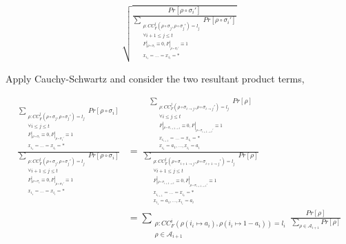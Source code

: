 \begin{align*}
            \sqrt{\frac{Pr[\rho \circ \sigma_{i}']}{\underset{\substack{\rho: CC_F^{j}(\rho\circ \sigma_j, \rho \circ \sigma_j')= l_j\\ \forall i+1\leq j \leq t\\F|_{\rho\circ \sigma_t} \equiv 0, F|_{\rho\circ \sigma_t'}\equiv 1\\x_{i_{1}}=\ldots= x_{i_t} = *}} {\sum} Pr[\rho\circ \sigma_{i}' ]}}
\end{align*}

Apply Cauchy-Schwartz and consider the two resultant product terms,

\begin{align*}
\frac{
\underset{\substack{\rho: CC_F^{j}(\rho\circ \sigma_j, \rho \circ \sigma_j')= l_j\\ \forall i\leq j \leq t\\ F|_{\rho\circ \sigma_t} \equiv 0, F|_{\rho\circ \sigma_t'}\equiv 1\\x_{i_1}=\ldots= x_{i_t} = *}} {\sum} Pr[\rho \circ \sigma_{i}]
}
{
\underset{\substack{\rho: CC_F^{j}(\rho\circ \sigma_j, \rho \circ \sigma_j')= l_j\\ \forall i+1\leq j \leq t\\F|_{\rho\circ \sigma_t} \equiv 0, F|_{\rho\circ \sigma_t'}\equiv 1\\x_{i_{1}}=\ldots= x_{i_t} = *}} {\sum} Pr[\rho\circ \sigma_{i} ]
}
&= \
\frac{
\underset{\substack{\rho: CC_F^{j}(\rho\circ \sigma_{i \to j}, \rho \circ \sigma_{i \to j}')= l_j\\ \forall i\leq j \leq t\\ F|_{\rho\circ \sigma_{i+1 \to t}} \equiv 0, F|_{\rho\circ \sigma_{i+1 \to t}'}\equiv 1\\x_{i_{i+1}}=\ldots= x_{i_t} = *\\ x_{i_1} = a_1, \dots, x_{i_i}=a_i }} {\sum} Pr[\rho]
}
{
\underset{\substack{\rho: CC_F^{j}(\rho\circ \sigma_{i+1 \to j}, \rho \circ \sigma_{i+1 \to j}')= l_j\\ \forall i+1\leq j \leq t\\F|_{\rho\circ \sigma_{i+1 \to t}} \equiv 0, F|_{\rho\circ \sigma_{i+1 \to t}'}\equiv 1\\x_{i_{i+1}}=\ldots= x_{i_t} = *\\ x_{i_1} = a_1, \dots, x_{i_i}=a_i }} {\sum} Pr[\rho ]
}\\
&= 
\underset{\substack{\rho: CC_F^{i}(\rho(i_i \mapsto a_i),\rho(i_i \mapsto 1-a_i) )= l_i\\ \rho \in \mathcal{A}_{i+1}}} {\sum} \frac{Pr[\rho]}{\underset{\rho \in \mathcal{A}_{i+1}} {\sum} Pr[\rho]}
\end{align*}

